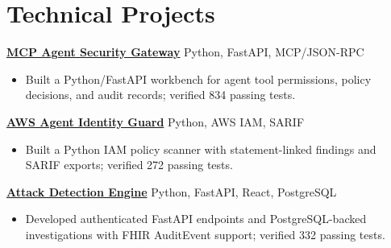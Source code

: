 \documentclass[letterpaper,10pt]{article}
\begin{document}
\section{Technical Projects}
\textbf{\href{https://github.com/poojakira/mcp-agent-security-gateway}{MCP Agent Security Gateway}} \hfill Python, FastAPI, MCP/JSON-RPC
\begin{itemize}
\item Built a Python/FastAPI workbench for agent tool permissions, policy decisions, and audit records; verified 834 passing tests.
\end{itemize}
\textbf{\href{https://github.com/poojakira/aws-agent-identity-guard}{AWS Agent Identity Guard}} \hfill Python, AWS IAM, SARIF
\begin{itemize}
\item Built a Python IAM policy scanner with statement-linked findings and SARIF exports; verified 272 passing tests.
\end{itemize}
\textbf{\href{https://github.com/poojakira/attack-detection-engine}{Attack Detection Engine}} \hfill Python, FastAPI, React, PostgreSQL
\begin{itemize}
\item Developed authenticated FastAPI endpoints and PostgreSQL-backed investigations with FHIR AuditEvent support; verified 332 passing tests.
\end{itemize}
\end{document}
